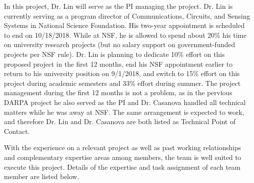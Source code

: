 In this project, Dr. Lin will serve as the PI managing the project. Dr. Lin is currently serving as a program director of Communications, Circuits, and Sensing Systems in National Science Foundation. His two-year appointment is scheduled to end on 10/18/2018. While at NSF, he is allowed to spend about 20\% his time on university research projects (but no salary support on government-funded projects per NSF rule). Dr. Lin is planning to dedicate 10\% effort on this proposed project in the first 12 months, end his NSF appointment earlier to return to his university position on 9/1/2018, and switch to 15\% effort on this project during academic semesters and 33\% effort during summer. The project management during the first 12 months is not a problem, as in the pervious DARPA project he also served as the PI and Dr. Casanova handled all technical matters while he was away at NSF. The same arrangement is expected to work, and therefore Dr. Lin and Dr. Casanova are both listed as Technical Point of Contact. 

With the experience on a relevant project as well as past working relationships and complementary expertise areas among members, the team is well suited to execute this project. Details of the expertise and task assignment of each team member are listed below. 

